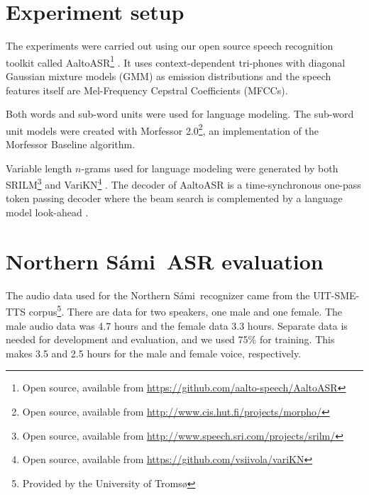 \documentclass[b5paper]{article}
\newcommand{\note}[1]{{\textcolor{blue}{#1}}}
\newcommand{\ns}{Northern Sámi}
\newcommand{\ngram}{$n$-gram}
\begin{document}


\section{Experiment setup}



The experiments were carried out using our open source speech recognition toolkit called AaltoASR\footnote{Open source, available from \url{https://github.com/aalto-speech/AaltoASR}} \cite{hirsimaki2009importance}\cite{pylkkonen2005efficient}. It uses context-dependent tri-phones with diagonal Gaussian mixture models (GMM) as emission distributions and the speech features itself are Mel-Frequency Cepstral Coefficients (MFCCs). 

Both words and sub-word units were used for language modeling. The sub-word unit models were created with Morfessor 2.0\footnote{Open source, available from \url{http://www.cis.hut.fi/projects/morpho/}}, an implementation of the Morfessor Baseline algorithm\cite{virpioja2013morfessor}. 

Variable length \ngram s used for language modeling were generated by both SRILM\footnote{Open source, available from \url{http://www.speech.sri.com/projects/srilm/}} \cite{stolcke2002srilm} and VariKN\footnote{Open source, available from \url{https://github.com/vsiivola/variKN}} \cite{siivola2007growing,siivola2007morfessor}. The decoder of AaltoASR is a time-synchronous one-pass token passing decoder where the beam search is complemented by a language model look-ahead \cite{ortmanns1997look}.




\section{\ns\ ASR evaluation} 
\label{sec:samiexp}
The audio data used for the \ns\ recognizer came from the UIT-SME-TTS corpus\footnote{Provided by the University of Tromsø}. There are data for two speakers, one male and one female. The male audio data was 4.7 hours and the female data 3.3 hours. Separate data is needed for development and evaluation, and we used 75\% for training. This makes 3.5 and 2.5 hours for the male and female voice, respectively.
\end{document}
